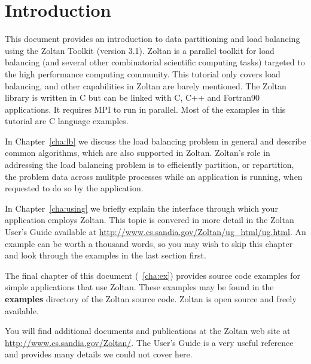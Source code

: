 %
% 
%
\chapter{Introduction}

This document provides an introduction to data partitioning
and load balancing using the Zoltan Toolkit (version 3.1).  
Zoltan is a parallel toolkit for load balancing
(and several other combinatorial scientific computing tasks) 
targeted to the high performance computing community.  
This tutorial only covers load balancing,
and other capabilities in Zoltan are barely mentioned.
The Zoltan library is written in C but can be
linked with C, C++ and Fortran90 applications.  
It requires MPI to run in parallel.
Most of the examples in this tutorial are C language examples.

In Chapter~\ref{cha:lb} we
discuss the load balancing problem in general and describe
common algorithms, which are also supported in Zoltan.
Zoltan's role in addressing the load balancing problem is to 
efficiently partition,
or repartition, the problem data across mulitple processes while an
application is running, when requested to do so by the application.


In Chapter~\ref{cha:using} we briefly explain the interface
through which your application employs Zoltan.  This topic is
convered in more detail in the
Zoltan User's Guide available at
\url{http://www.cs.sandia.gov/Zoltan/ug_html/ug.html}.
An example can be worth a thousand words, so you may wish to 
skip this chapter and look through the examples in the last section first.

The final chapter of this document (~\ref{cha:ex}) provides
source code examples for simple applications that use Zoltan.
These examples may be found in the \textbf{examples} directory
of the Zoltan source code.  Zoltan is open source and freely available.

You will find additional documents and publications at the
Zoltan web site at \url{http://www.cs.sandia.gov/Zoltan/}.
The User's Guide is a very useful reference and provides
many details we could not cover here.

